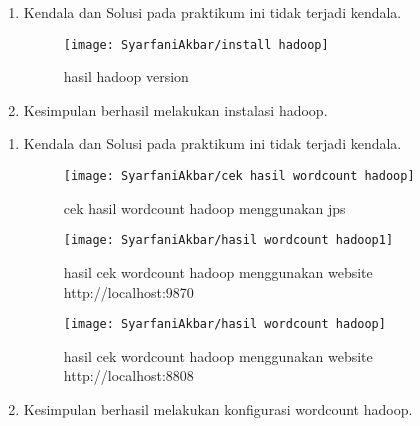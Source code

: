 
\begin{enumerate}
\item Kendala dan Solusi
pada praktikum ini tidak terjadi kendala.

\begin{figure}[!ht]
\texttt{[image: SyarfaniAkbar/install hadoop]}
\caption{hasil hadoop version}
\label{gam:install hadoop}
\end{figure}

\item Kesimpulan
berhasil melakukan instalasi hadoop.
\end{enumerate}


\newpage
{}
\begin{enumerate}
\item Kendala dan Solusi
pada praktikum ini tidak terjadi kendala.

\begin{figure}[!ht]
\texttt{[image: SyarfaniAkbar/cek hasil wordcount hadoop]}
\caption{cek hasil wordcount hadoop menggunakan jps}
\label{gam:cek hasil wordcount hadoop}
\end{figure}

\begin{figure}[!ht]
\texttt{[image: SyarfaniAkbar/hasil wordcount hadoop1]}
\caption{hasil cek wordcount hadoop menggunakan website http://localhost:9870}
\label{gam:hasil wordcount hadoop1}
\end{figure}

\begin{figure}[!ht]
\texttt{[image: SyarfaniAkbar/hasil wordcount hadoop]}
\caption{hasil cek wordcount hadoop menggunakan website http://localhost:8808}
\label{gam:hasil wordcount hadoop}
\end{figure}

\item Kesimpulan
berhasil melakukan konfigurasi wordcount hadoop.
\end{enumerate}

